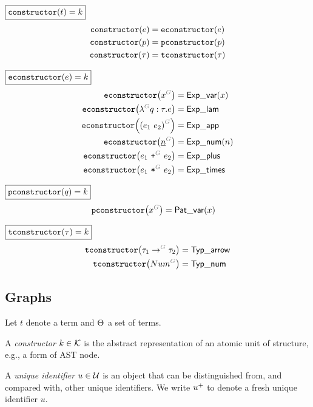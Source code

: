 \noindent $\boxed{\operatorname{\texttt{constructor}}\mathopen{}\left(t\right)\mathclose{} = k}$
%
\begin{align*}
  \operatorname{\texttt{constructor}}\mathopen{}\left(e\right)\mathclose{} &= \operatorname{\texttt{econstructor}}\mathopen{}\left(e\right)\mathclose{} \\
  \operatorname{\texttt{constructor}}\mathopen{}\left(p\right)\mathclose{} &= \operatorname{\texttt{pconstructor}}\mathopen{}\left(p\right)\mathclose{} \\
  \operatorname{\texttt{constructor}}\mathopen{}\left(\tau\right)\mathclose{} &= \operatorname{\texttt{tconstructor}}\mathopen{}\left(\tau\right)\mathclose{}
\end{align*}

\noindent $\boxed{\operatorname{\texttt{econstructor}}\mathopen{}\left(e\right)\mathclose{} = k}$
%
\begin{align*}
  \econstructor{\eVar{G}{x}} &= \ExpVar(x) \\
  \econstructor{\eFun{G}{q}{\tau}{e}} &= \ExpLam \\
  \econstructor{\eApp{G}{e_1}{e_2}} &= \ExpApp \\
  \econstructor{\eNum{G}{n}} &= \ExpNum(n) \\
  \econstructor{\ePlus{G}{e_1}{e_2}} &= \ExpPlus \\
  \econstructor{\eTimes{G}{e_1}{e_2}} &= \ExpTimes
\end{align*}

\noindent $\boxed{\operatorname{\texttt{pconstructor}}\mathopen{}\left(q\right)\mathclose{} = k}$
%
\begin{align*}
  \pconstructor{\pVar{G}{x}} &= \PatVar(x)
\end{align*}

\noindent $\boxed{\operatorname{\texttt{tconstructor}}\mathopen{}\left(\tau\right)\mathclose{} = k}$
%
\begin{align*}
  \tconstructor{\tArrow{G}{\tau_1}{\tau_2}} &= \TypArrow \\
  \tconstructor{\tNum{G}} &= \TypNum
\end{align*}


\subsection{Graphs}

Let $t$ denote a term and $\Theta_{}$ a set of terms.

\begin{definition}
  A \emph{constructor} $k \in \mathcal{K}$ is the abstract representation of an atomic unit of structure, e.g., a form of AST node.
\end{definition}

\begin{definition}
  A \emph{unique identifier} $u \in \mathcal{U}$ is an object that can be distinguished from, and compared with, other unique identifiers.
  We write ${u}^{+}$ to denote a fresh unique identifier $u$.
\end{definition}

